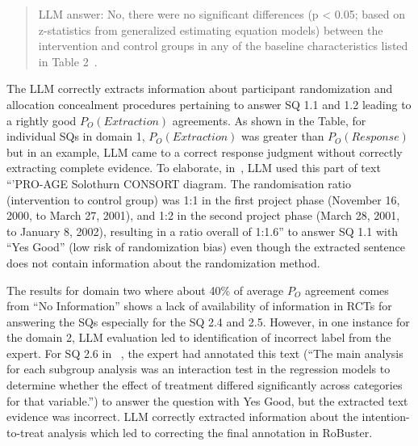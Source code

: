 \documentclass[sn-mathphys,Numbered]{sn-jnl}%
\theoremstyle{thmstyleone}%
\theoremstyle{thmstyletwo}%
\theoremstyle{thmstylethree}%
\begin{document}
\begin{quote}
    LLM answer: No, there were no significant differences (p < 0.05; based on z-statistics from generalized estimating equation models) between the intervention and control groups in any of the baseline characteristics listed in Table 2~\cite{stuck2015effect}.
\end{quote}

The LLM correctly extracts information about participant randomization and allocation concealment procedures pertaining to answer SQ 1.1 and 1.2 leading to a rightly good $P_{O} (Extraction)$ agreements. 
As shown in the Table, for individual SQs in domain 1, $P_{O} (Extraction)$ was greater than $P_{O} (Response)$ but in an example, LLM came to a correct response judgment without correctly extracting complete evidence.
To elaborate, in~\cite{stuck2015effect}, LLM used this part of text ``'PRO-AGE Solothurn CONSORT diagram. The randomisation ratio (intervention to control group) was 1:1 in the first project phase (November 16, 2000, to March 27, 2001), and 1:2 in the second project phase (March 28, 2001, to January 8, 2002), resulting in a ratio overall of 1:1.6'' to answer SQ 1.1 with ``Yes Good'' (low risk of randomization bias) even though the extracted sentence does not contain information about the randomization method.


The results for domain two where about 40\% of average $P_{O}$ agreement comes from ``No Information'' shows a lack of availability of information in RCTs for answering the SQs especially for the SQ 2.4 and 2.5.
However, in one instance for the domain 2, LLM evaluation led to identification of incorrect label from the expert. 
For SQ 2.6 in ~\cite{hassett2020digitally}, the expert had annotated this text (``The main analysis for each subgroup analysis was an interaction test in the regression models to determine whether the effect of treatment differed significantly across categories for that variable.'') to answer the question with Yes Good, but the extracted text evidence was incorrect.
LLM correctly extracted information about the intention-to-treat analysis which led to correcting the final annotation in RoBuster.
\end{document}
